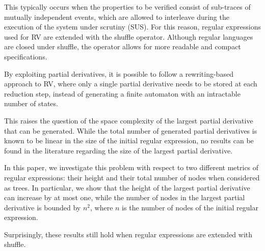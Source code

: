 This typically occurs when the properties to be verified consist of sub-traces of mutually independent events, which are allowed to interleave during the execution of the system under scrutiny (SUS). For this reason, regular expressions used for RV are extended with the shuffle operator. Although regular languages are closed under shuffle, the operator allows for more readable and compact specifications.

By exploiting partial derivatives, it is possible to follow a rewriting-based approach to RV, where only a single partial derivative needs to be stored at each reduction step, instead of generating a finite automaton with an intractable number of states.

This raises the question of the space complexity of the largest partial derivative that can be generated. While the total number of generated partial derivatives is known to be linear in the size of the initial regular expression, no results can be found in the literature regarding the size of the largest partial derivative.

In this paper, we investigate this problem with respect to two different metrics of regular expressions: their height and their total number of nodes when considered as trees. In particular, we show that the height of the largest partial derivative can increase by at most one, while the number of nodes in the largest partial derivative is bounded by $n^2$, where $n$ is the number of nodes of the initial regular expression.

Surprisingly, these results still hold when regular expressions are extended with shuffle.